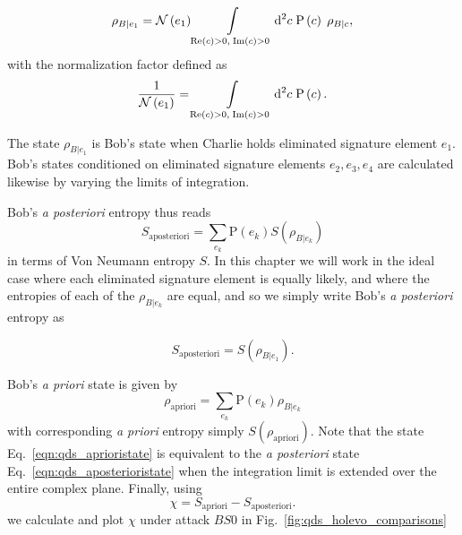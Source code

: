 \begin{equation}\label{eqn:qds_aposterioristate}
\rho_{B | e_1} = \mathcal{N}\left(e_1\right) \int\limits_{\text{Re}\left(c\right) > 0, \; \text{Im}\left(c\right)>0} \mathop{}\!\mathrm{d^2} c \; \text{P}\left(c\right) \; \rho_{B | c},
\end{equation}
with the normalization factor defined as 
\begin{equation}
\frac{1}{\mathcal{N}\left(e_1\right)} = \int\limits_{\text{Re}\left(c\right) > 0, \; \text{Im}\left(c\right)>0} \mathop{}\!\mathrm{d^2} c \; \text{P}\left(c\right).
\end{equation}

\noindent The state $\rho_{B|e_1}$ is Bob's state when Charlie holds eliminated signature element $e_1$. Bob's states conditioned on eliminated signature elements $e_2, e_3, e_4$ are calculated likewise by varying the limits of integration.

Bob's \emph{a posteriori} entropy thus reads
\begin{equation}
S_{\text{aposteriori}} = \sum_{e_k} \text{P}\left(e_k\right) S\left(\rho_{B | e_k}\right)
\end{equation}
in terms of Von Neumann entropy $S$. In this chapter we will work in the ideal case where each eliminated signature element is equally likely, and where the entropies of each of the $\rho_{B | e_k}$ are equal, and so we simply write Bob's \emph{a posteriori} entropy as

\begin{equation}\label{eqn:aposteriori_entropy}
S_{\text{aposteriori}} = S\left(\rho_{B | e_1}\right).
\end{equation}

Bob's \emph{a priori} state is given by
\begin{equation}\label{eqn:qds_aprioristate}
\rho_{\text{apriori}} = \sum_{e_k} \text{P}\left(e_k\right) \rho_{B|e_k}
\end{equation}
with corresponding \emph{a priori} entropy simply $S\left(\rho_{\text{apriori}}\right)$. Note that the state Eq.~\ref{eqn:qds_aprioristate} is equivalent to the \emph{a posteriori} state Eq.~\ref{eqn:qds_aposterioristate} when the integration limit is extended over the entire complex plane. Finally, using
\begin{equation}
\chi = S_{\text{apriori}} - S_{\text{aposteriori}}.
\end{equation}
we calculate and plot $\chi$ under attack $BS0$ in Fig.~\ref{fig:qds_holevo_comparisons}

